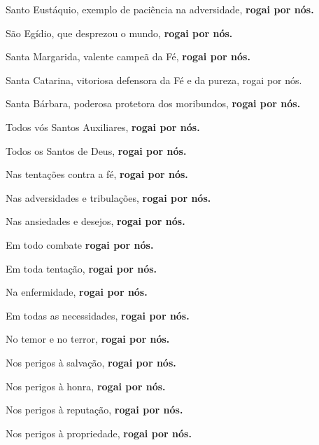 \documentclass[a4paper,12pt]{extarticle} \usepackage[utf8]{inputenc}
\begin{document}
 

Santo Eustáquio, exemplo de paciência na adversidade, \textbf{rogai por nós.}

 

São Egídio, que desprezou o mundo, \textbf{rogai por nós.}

 

Santa Margarida, valente campeã da Fé, \textbf{rogai por nós.}

 

Santa Catarina, vitoriosa defensora da Fé e da pureza, rogai por nós.

 

Santa Bárbara, poderosa protetora dos moribundos, \textbf{rogai por nós.}

 

Todos vós Santos Auxiliares, \textbf{rogai por nós.}

Todos os Santos de Deus, \textbf{rogai por nós.}

 

Nas tentações contra a fé, \textbf{rogai por nós.}

 

Nas adversidades e tribulações, \textbf{rogai por nós.}

 

Nas ansiedades e desejos, \textbf{rogai por nós.}

 

Em todo combate \textbf{rogai por nós.}

 

Em toda tentação, \textbf{rogai por nós.}

 

Na enfermidade, \textbf{rogai por nós.}

 

Em todas as necessidades, \textbf{rogai por nós.}

 

No temor e no terror, \textbf{rogai por nós.}

 

Nos perigos à salvação, \textbf{rogai por nós.}

 

Nos perigos à honra, \textbf{rogai por nós.}

 

Nos perigos à reputação, \textbf{rogai por nós.}

 

Nos perigos à propriedade, \textbf{rogai por nós.}

 
\end{document}
